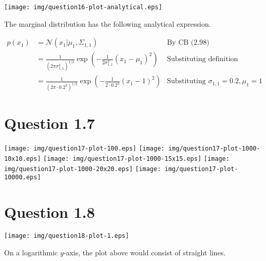 \documentclass[a4paper, oneside, final]{memoir}
\begin{document}
\texttt{[image: img/question16-plot-analytical.eps]}

The marginal distribution has the following analytical expression.

\begin{align*}
  p(x_1) &= \mathcal{N}(x_1|\mu_1,\Sigma_{1,1}) & \text{By CB (2.98)}\\
  &=
  \frac{1}{(2\pi\sigma_{1,1}^2)^{1/2}}\exp\left({-\frac{1}{2\sigma_{1,1}^2}(x_1-\mu_1)^2}\right)
  & \text{Substituting definition} \\
  &=
  \frac{1}{(2\pi\cdot 0.2^2)^{1/2}}\exp\left({-\frac{1}{2\cdot0.2^2}(x_1-1)^2}\right)
  & \text{Substituting $\sigma_{1,1}=0.2,\mu_1=1$}
\end{align*}

\section*{Question 1.7}

\texttt{[image: img/question17-plot-100.eps]}
\texttt{[image: img/question17-plot-1000-10x10.eps]}
\texttt{[image: img/question17-plot-1000-15x15.eps]}
\texttt{[image: img/question17-plot-1000-20x20.eps]}
\texttt{[image: img/question17-plot-10000.eps]}

\section*{Question 1.8}


\texttt{[image: img/question18-plot-1.eps]}

On a logarithmic $y$-axis, the plot above would consist of straight
lines.
\end{document}
